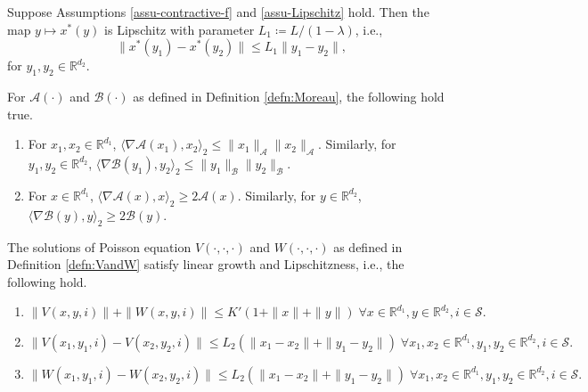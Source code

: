 \documentclass[10pt,a4paper]{amsart}
\newcommand{\Acal}{\mathcal{A}}
\newcommand{\Bcal}{\mathcal{B}}
\newcommand{\RR}{\mathbb{R}}
\newcommand{\Scal}{\mathcal{S}}
\newcommand{\xstar}{x^*}
\begin{document}
\begin{lemma}\label{lem:xstar-Lipschitz}
    Suppose Assumptions \ref{assu-contractive-f} and \ref{assu-Lipschitz} hold. Then the map $y\mapsto\xstar(y)$ is Lipschitz with parameter $L_1\coloneqq L/(1-\lambda)$, i.e.,
    \begin{equation*}
      \|\xstar(y_1)-\xstar(y_2)\|\leq L_1\|y_1-y_2\|,
    \end{equation*}
    for $y_1,y_2\in\RR^{d_2}$.
\end{lemma}

\begin{lemma}\label{lemma:subg}
    For $\Acal(\cdot)$ and $\Bcal(\cdot)$ as defined in Definition \ref{defn:Moreau}, the following hold true.
    \begin{enumerate}[label=(\alph*)]
        \item  For $x_1,x_2\in\RR^{d_1}$,  $\langle \nabla \Acal(x_1),x_2\rangle_2 \leq \|x_1\|_\Acal\|x_2\|_\Acal.$ Similarly, for $y_1,y_2\in\RR^{d_2}$,  $\langle \nabla \Bcal(y_1),y_2\rangle_2 \leq \|y_1\|_\Bcal\|y_2\|_\Bcal.$
        \item For $x\in\RR^{d_1}$, 
        $\langle \nabla \Acal(x), x\rangle_2\geq 2\Acal(x).$ Similarly, for $y\in\RR^{d_2}$, 
        $\langle \nabla \Bcal(y), y\rangle_2\geq 2\Bcal(y).$
    \end{enumerate}
\end{lemma}

\begin{lemma}\label{lem:poisson_soln-prop}
    The solutions of Poisson equation $V(\cdot,\cdot,\cdot)$ and $W(\cdot,\cdot,\cdot)$ as defined in Definition \ref{defn:VandW} satisfy linear growth and Lipschitzness, i.e., the following hold.
    \begin{enumerate}[label=(\alph*)]
        \item $\|V(x,y,i)\|+\|W(x,y,i)\|\leq K'(1+\|x\|+\|y\|)\; \forall x\in\RR^{d_1}, y\in\RR^{d_2}, i\in\Scal.$
        \item $\|V(x_1,y_1,i)-V(x_2,y_2,i)\|\leq L_2(\|x_1-x_2\|+\|y_1-y_2\|) \; \forall x_1,x_2\in\RR^{d_1}, y_1,y_2\in\RR^{d_2}, i\in\Scal.$
        \item $\|W(x_1,y_1,i)-W(x_2,y_2,i)\|\leq L_2(\|x_1-x_2\|+\|y_1-y_2\|) \; \forall x_1,x_2\in\RR^{d_1}, y_1,y_2\in\RR^{d_2}, i\in\Scal.$
    \end{enumerate}
\end{lemma}
\end{document}

